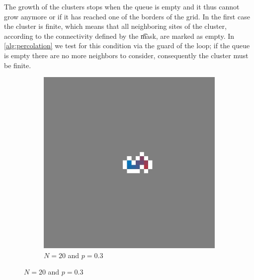 The growth of the clusters stops when the queue is empty and it thus cannot grow anymore or if it has reached one of the borders of the grid. In the first case the cluster is finite, which means that all neighboring sites of the cluster, according to the connectivity defined by the \t{mask}, are marked as empty. In \cref{alg:percolation} we test for this condition via the guard of the loop; if the queue is empty there are no more neighbors to consider, consequently the cluster must be finite. 

\begin{figure}[t!]
	\centering	
	\begin{subfigure}{0.50\columnwidth}
		\centering
		\includegraphics[width=\textwidth]{./img/fancy_cluster_N20_p3_rng_8}
		\caption{$N = 20$ and $p = 0.3$}
		\label{fig:method:fin_inf:finiteSmall}
	\end{subfigure}


\end{figure}
